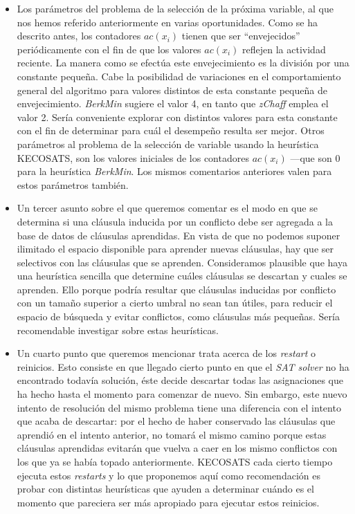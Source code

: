 \documentclass[12pt,lettersize,oneside]{article}
\begin{document}
\begin{itemize}
\item Los parámetros del problema de la selección de la próxima variable, al que
  nos hemos referido anteriormente en varias oportunidades. Como se ha descrito
  antes, los contadores $ac(x_i)$ tienen que ser ``envejecidos'' periódicamente
  con el fin de que los valores $ac(x_i)$ reflejen la actividad reciente. La
  manera como se efectúa este envejecimiento es la división por una constante
  pequeña. Cabe la posibilidad de variaciones en el comportamiento general del
  algoritmo para valores distintos de esta constante pequeña de
  envejecimiento. \emph{BerkMin} sugiere el valor 4, en tanto que \emph{zChaff}
  emplea el valor 2. Sería conveniente explorar con distintos valores para esta
  constante con el fin de determinar para cuál el desempeño resulta ser mejor.
  Otros parámetros al problema de la selección de variable usando la heurística
  KECOSATS, son los valores iniciales de los contadores $ac(x_i)$ ---que son 0
  para la heurística \emph{BerkMin}. Los mismos comentarios anteriores valen
  para estos parámetros también.

\item Un tercer asunto sobre el que queremos comentar es el modo en que se
  determina si una cláusula inducida por un conflicto debe ser agregada a la
  base de datos de cláusulas aprendidas. En vista de que no podemos suponer
  ilimitado el espacio disponible para aprender nuevas cláusulas, hay que ser
  selectivos con las cláusulas que se aprenden. Consideramos plausible que haya
  una heurística sencilla que determine cuáles cláusulas se descartan y cuales
  se aprenden. Ello porque podría resultar que cláusulas inducidas por conflicto
  con un tamaño superior a cierto umbral no sean tan útiles, para reducir el
  espacio de búsqueda y evitar conflictos, como cláusulas más pequeñas. Sería
  recomendable investigar sobre estas heurísticas.

\item Un cuarto punto que queremos mencionar trata acerca de los \emph{restart}
  o reinicios. Esto consiste en que llegado cierto punto en que el \emph{SAT
    solver} no ha encontrado todavía solución, éste decide descartar todas las
  asignaciones que ha hecho hasta el momento para comenzar de nuevo. Sin
  embargo, este nuevo intento de resolución del mismo problema tiene una
  diferencia con el intento que acaba de descartar: por el hecho de haber
  conservado las cláusulas que aprendió en el intento anterior, no tomará el
  mismo camino porque estas cláusulas aprendidas evitarán que vuelva a caer en
  los mismo conflictos con los que ya se había topado anteriormente. KECOSATS
  cada cierto tiempo ejecuta estos \emph{restarts} y lo que proponemos aquí como
  recomendación es probar con distintas heurísticas que ayuden a determinar
  cuándo es el momento que pareciera ser más apropiado para ejecutar estos
  reinicios.


\end{itemize}
\end{document}
